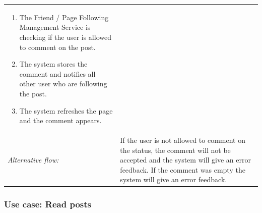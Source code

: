 \documentclass[11pt,a4paper]{report}
\begin{document}
\begin{longtable}{p{} | p{}}
\begin{enumerate}
                \item The Friend / Page Following Management Service is checking if the user is allowed to comment on the post.
                \item The system stores the comment and notifies all other user who are following the post.
                \item The system refreshes the page and the comment appears.
             \end{enumerate} \\
        \emph{Alternative flow:} & If the user is not allowed to comment on the status, the comment will not be accepted and the system will give an error feedback. If the comment was empty the system will give an error feedback.\\ 
             \hline
\end{longtable}

\subsubsection{Use case: Read posts}
\end{document}
